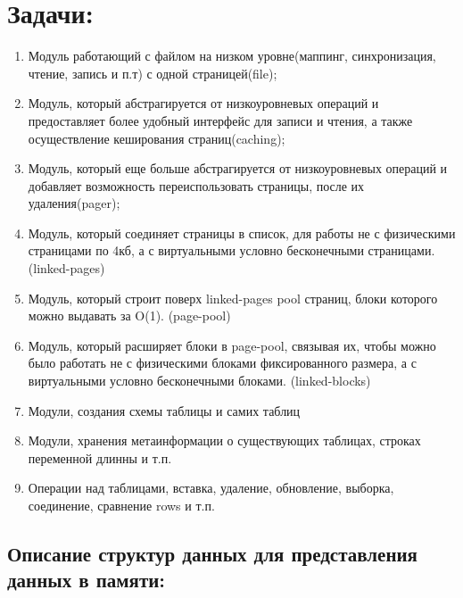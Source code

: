 \documentclass[12pt,onecolumn]{article}
\begin{document}
\section{Задачи:}
\begin{enumerate}
  \item Модуль работающий с файлом на низком уровне(маппинг, синхронизация, чтение, запись и п.т) с одной страницей(file);
  \item Модуль, который абстрагируется от низкоуровневых операций и предоставляет более удобный интерфейс для записи и чтения, а также осуществление кеширования страниц(caching);
  \item Модуль, который еще больше абстрагируется от низкоуровневых операций и добавляет возможность переиспользовать страницы, после их удаления(pager);
  \item Модуль, который соединяет страницы в список, для работы не с физическими страницами по 4кб, а с виртуальными условно бесконечными страницами. (linked-pages)
  \item Модуль, который строит поверх linked-pages pool страниц, блоки которого можно выдавать за O(1). (page-pool)
  \item Модуль, который расширяет блоки в page-pool, связывая их, чтобы можно было работать не с физическими блоками фиксированного размера, а с виртуальными условно бесконечными блоками. (linked-blocks)
  \item Модули, создания схемы таблицы и самих таблиц
  \item Модули, хранения метаинформации о существующих таблицах, строках переменной длинны и т.п.
  \item Операции над таблицами, вставка, удаление, обновление, выборка, соединение, сравнение rows и т.п.
\end{enumerate}
\subsection{Описание структур данных для представления данных в памяти:}
\end{document}
